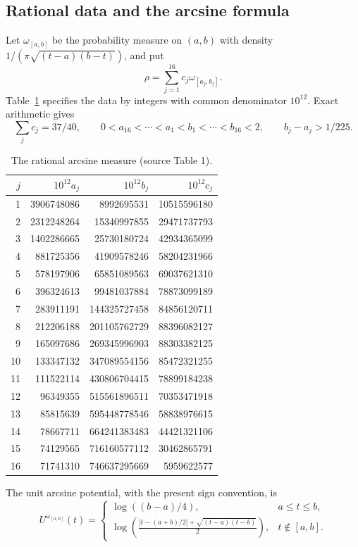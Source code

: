 \subsection{Rational data and the arcsine formula}
Let $\omega_{[a,b]}$ be the probability measure on $(a,b)$ with density
$1/(\pi\sqrt{(t-a)(b-t)})$, and put
\[
 \rho=\sum_{j=1}^{16}c_j\omega_{[a_j,b_j]}.
\]
Table~\ref{tab:arcsine} specifies the data by integers with common
denominator $10^{12}$. Exact arithmetic gives
\[
 \sum_jc_j=37/40,\qquad
 0<a_{16}<\cdots<a_1<b_1<\cdots<b_{16}<2,\qquad
 b_j-a_j>1/225.
\]
\begin{table}[htbp]
\centering\small
\caption{The rational arcsine measure (source Table 1).}\label{tab:arcsine}
\begin{tabular}{rrrr}\toprule
$j$ & $10^{12}a_j$ & $10^{12}b_j$ & $10^{12}c_j$\\\midrule
1 & 3906748086 & 8992695531 & 10515596180\\
2 & 2312248264 & 15340997855 & 29471737793\\
3 & 1402286665 & 25730180724 & 42934365099\\
4 & 881725356 & 41909578246 & 58204231966\\
5 & 578197906 & 65851089563 & 69037621310\\
6 & 396324613 & 99481037884 & 78873099189\\
7 & 283911191 & 144325727458 & 84856120711\\
8 & 212206188 & 201105762729 & 88396082127\\
9 & 165097686 & 269345996903 & 88303382125\\
10 & 133347132 & 347089554156 & 85472321255\\
11 & 111522114 & 430806704415 & 78899184238\\
12 & 96349355 & 515561896511 & 70353471918\\
13 & 85815639 & 595448778546 & 58838976615\\
14 & 78667711 & 664241383483 & 44421321106\\
15 & 74129565 & 716160577112 & 30462865791\\
16 & 71741310 & 746637295669 & 5959622577\\
\bottomrule\end{tabular}
\end{table}
The unit arcsine potential, with the present sign convention, is
\begin{equation}\label{eq:arcsinepotential}
 U^{\omega_{[a,b]}}(t)=
 \begin{cases}
 \log((b-a)/4),&a\le t\le b,\\
 \displaystyle\log\left(
 \frac{|t-(a+b)/2|+\sqrt{(t-a)(t-b)}}2\right),&t\notin[a,b].
 \end{cases}
\end{equation}
